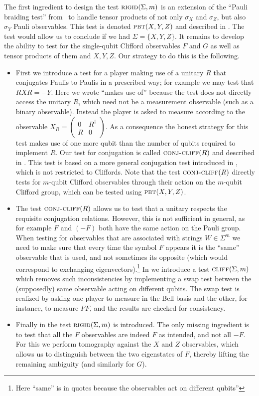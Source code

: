 \documentclass{toc}
\newcommand{\pbt}{\textsc{pbt}}
\newcommand{\rigid}{\textsc{rigid}}
\newcommand{\conjc}{\textsc{conj-cliff}}
\newcommand{\cliff}{\textsc{cliff}}
\begin{document}
The first ingredient to design the test $\rigid(\Sigma,m)$ is an extension of the ``Pauli braiding test'' from~\cite{natarajan2016robust} to handle tensor products of not only $\sigma_X$ and $\sigma_Z$, but also $\sigma_Y$ Pauli observables. This test is denoted $\pbt(X,Y,Z)$ and described in . The test would allow us to conclude if we had $\Sigma=\{X,Y,Z\}$. It remains to develop the ability to test for the single-qubit Clifford observables $F$ and $G$ as well as tensor products of them and $X,Y,Z$. Our strategy to do this is the following.
\begin{itemize}
\item First we introduce a test for a player making use of a unitary $R$ that conjugates Paulis to Paulis in a prescribed way; for example we may test that $RXR=-Y$. Here we wrote ``makes use of'' because the test does not directly access the unitary $R$, which need not be a measurement observable (such as a binary observable). Instead the player is asked to measure according to the observable $X_R = \begin{pmatrix} 0 & R^\dagger \\ R & 0 \end{pmatrix}$. As a consequence the honest strategy for this test makes use of one more qubit than the number of qubits required to implement $R$. Our test for conjugation is called $\conjc(R)$ and described in . This test is based on a more general conjugation test introduced in , which is not restricted to Cliffords. Note that the test $\conjc(R)$ directly tests for $m$-qubit Clifford observables through their action on the $m$-qubit Clifford group, which can be tested using $\pbt(X,Y,Z)$. 
\item The test $\conjc(R)$ allows us to test that a unitary respects the requisite conjugation relations. However, this is not sufficient in general, as for example $F$ and $(-F)$ both have the same action on the Pauli group. When testing for observables that are associated with strings $W\in\Sigma^m$ we need to make sure that every time the symbol $F$ appears it is the ``same'' observable that is used, and not sometimes its opposite (which would correspond to exchanging eigenvectors).\footnote{Here %
``same''  %
is in quotes because the observables act on different qubits''} In  we introduce a test $\cliff(\Sigma,m)$ which removes such inconsistencies by implementing a swap test between the (supposedly) same observable acting on different qubits. The swap test is realized by asking one player to measure in the Bell basis and the %
other, for instance, to  %
measure $FF$, and the results are checked for consistency. 
\item Finally in  the test $\rigid(\Sigma,m)$ is introduced. The only missing ingredient is to test that all the $F$ observables are indeed $F$ as intended, and not all $-F$. For this we perform tomography against the $X$ and $Z$ observables, which allows us to distinguish between the two eigenstates of $F$, thereby lifting the remaining ambiguity (and similarly for $G$).
\end{itemize}
\end{document}
